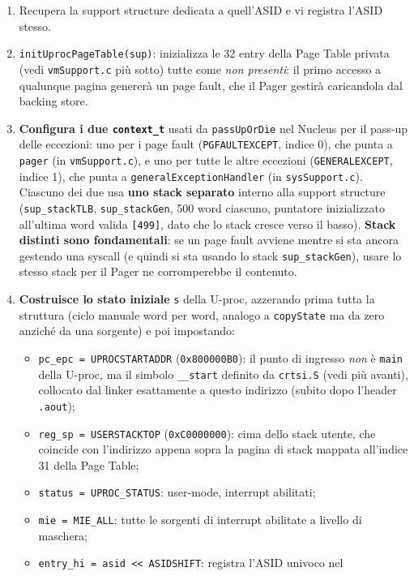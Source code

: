\documentclass[11pt,a4paper]{article}
\newcommand{\code}[1]{\texttt{#1}}
\begin{document}
\begin{enumerate}
\item Recupera la support structure dedicata a quell'ASID e vi registra
  l'ASID stesso.
\item \code{initUprocPageTable(sup)}: inizializza le 32 entry della Page
  Table privata (vedi \code{vmSupport.c} più sotto) tutte come \emph{non
  presenti}: il primo accesso a qualunque pagina genererà un page fault, che
  il Pager gestirà caricandola dal backing store.
\item \textbf{Configura i due \code{context\_t}} usati da
  \code{passUpOrDie} nel Nucleus per il pass-up delle eccezioni: uno per i
  page fault (\code{PGFAULTEXCEPT}, indice 0), che punta a \code{pager}
  (in \code{vmSupport.c}), e uno per tutte le altre eccezioni
  (\code{GENERALEXCEPT}, indice 1), che punta a
  \code{generalExceptionHandler} (in \code{sysSupport.c}). Ciascuno dei due
  usa \textbf{uno stack separato} interno alla support structure
  (\code{sup\_stackTLB}, \code{sup\_stackGen}, 500 word ciascuno,
  puntatore inizializzato all'ultima word valida \code{[499]}, dato che lo
  stack cresce verso il basso). \textbf{Stack distinti sono fondamentali}:
  se un page fault avviene mentre si sta ancora gestendo una syscall (e
  quindi si sta usando lo stack \code{sup\_stackGen}), usare lo stesso stack
  per il Pager ne corromperebbe il contenuto.
\item \textbf{Costruisce lo stato iniziale} \code{s} della U-proc, azzerando
  prima tutta la struttura (ciclo manuale word per word, analogo a
  \code{copyState} ma da zero anziché da una sorgente) e poi impostando:
  \begin{itemize}
  \item \code{pc\_epc = UPROCSTARTADDR} (\code{0x800000B0}): il punto di
    ingresso \emph{non} è \code{main} della U-proc, ma il simbolo
    \code{\_\_start} definito da \code{crtsi.S} (vedi più avanti), collocato
    dal linker esattamente a questo indirizzo (subito dopo l'header
    \code{.aout});
  \item \code{reg\_sp = USERSTACKTOP} (\code{0xC0000000}): cima dello stack
    utente, che coincide con l'indirizzo appena sopra la pagina di stack
    mappata all'indice 31 della Page Table;
  \item \code{status = UPROC\_STATUS}: user-mode, interrupt abilitati;
  \item \code{mie = MIE\_ALL}: tutte le sorgenti di interrupt abilitate a
    livello di maschera;
  \item \code{entry\_hi = asid << ASIDSHIFT}: registra l'ASID univoco nel

\end{itemize}
\end{enumerate}
\end{document}
